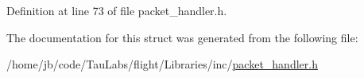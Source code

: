 \-Definition at line 73 of file packet\-\_\-handler.\-h.



\-The documentation for this struct was generated from the following file\-:\begin{DoxyCompactItemize}
\item 
/home/jb/code/\-Tau\-Labs/flight/\-Libraries/inc/\hyperlink{packet__handler_8h}{packet\-\_\-handler.\-h}\end{DoxyCompactItemize}
